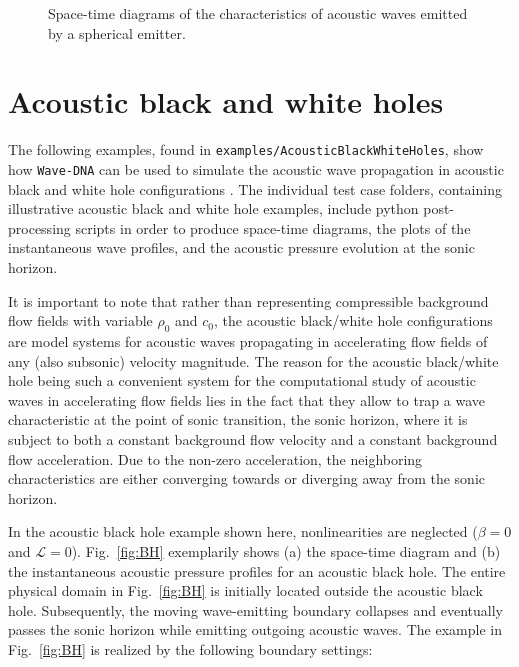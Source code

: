 \begin{figure}[t]
    \hfill
    \hfill
    \caption{Space-time diagrams of the characteristics of acoustic waves emitted by a spherical emitter.}
    \label{fig:rt_oscillatingEmitter}
\end{figure}


\section{Acoustic black and white holes}
\label{sec:Acoustic black and white holes}

The following examples, found in {\tt examples/AcousticBlackWhiteHoles}, show how {\tt Wave-DNA} can be used to simulate the acoustic wave propagation in acoustic black and white hole configurations \citep{Schenke_et_al_2022_PoF}. The individual test case folders, containing illustrative acoustic black and white hole examples, include python post-processing scripts in order to produce space-time diagrams, the plots of the instantaneous wave profiles, and the acoustic pressure evolution at the sonic horizon.

It is important to note that rather than representing compressible background flow fields with variable $\rho_0$ and $c_0$, the acoustic black/white hole configurations are model systems for acoustic waves propagating in accelerating flow fields of any (also subsonic) velocity magnitude. The reason for the acoustic black/white hole being such a convenient system for the computational study of acoustic waves in accelerating flow fields lies in the fact that they allow to trap a wave characteristic at the point of sonic transition, the sonic horizon, where it is subject to both a constant background flow velocity and a constant background flow acceleration. Due to the non-zero acceleration, the neighboring characteristics are either converging towards or diverging away from the sonic horizon.

In the acoustic black hole example shown here, nonlinearities are neglected ($\beta=0$ and $\mathcal{L}=0$). Fig.~\ref{fig:BH} exemplarily shows (a) the space-time diagram and (b) the instantaneous acoustic pressure profiles for an acoustic black hole. The entire physical domain in Fig.~\ref{fig:BH} is initially located outside the acoustic black hole. Subsequently, the moving wave-emitting boundary collapses and eventually passes the sonic horizon while emitting outgoing acoustic waves. The example in Fig.~\ref{fig:BH} is realized by the following boundary settings:

